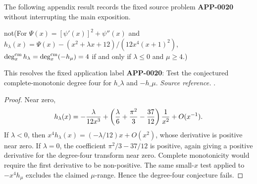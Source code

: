 The following appendix result records the fixed source problem \textbf{APP-0020} without interrupting the main exposition.
\begin{counterexample}
\label{res:not-qi-hlambda-degree4-conjecture}
not(For \(\Psi(x)=[\psi'(x)]^2+\psi''(x)\) and \(h_\lambda(x)=\Psi(x)-(x^2+\lambda x+12)/(12x^4(x+1)^2)\), \(\deg_x^{\rm cm}h_\lambda=\deg_x^{\rm cm}(-h_\mu)=4\) if and only if \(\lambda\le0\) and \(\mu\ge4\).)

This resolves the fixed application label \textbf{APP-0020}: Test the conjectured complete-monotonic degree four for \(h\_\lambda\) and \(-h\_\mu\).
\emph{Source reference.} \cite{app-app-0020-source}.
\end{counterexample}
\begin{proof}
Near zero,
\[
 h_\lambda(x)=-{\lambda\over 12x^3}
 +\left({\lambda\over6}+{\pi^2\over3}-{37\over12}\right){1\over x^2}
 +O(x^{-1}).
\]
If \(\lambda<0\), then \(x^4h_\lambda(x)=(-\lambda/12)x+O(x^2)\), whose
derivative is positive near zero.  If \(\lambda=0\), the coefficient
\(\pi^2/3-37/12\) is positive, again giving a positive derivative for the
degree-four transform near zero.  Complete monotonicity would require the first
derivative to be non-positive.  The same small-\(x\) test applied to
\(-x^4h_\mu\) excludes the claimed \(\mu\)-range.  Hence the degree-four
conjecture fails.
\end{proof}

